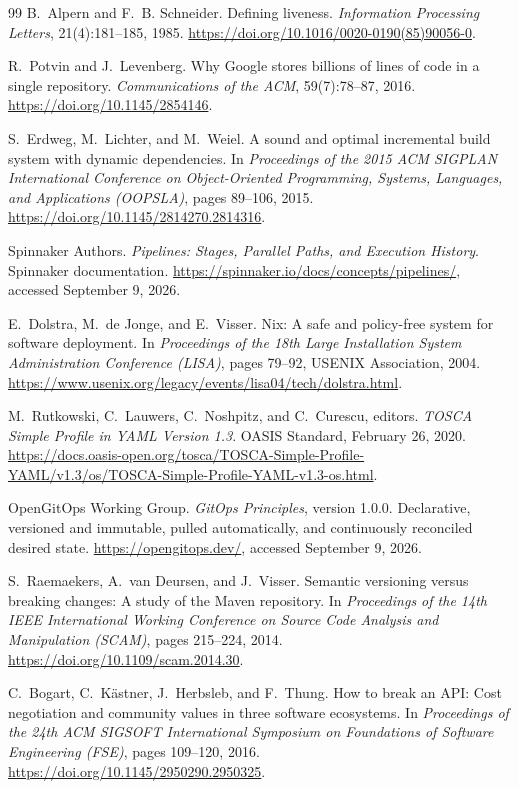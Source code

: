\begin{thebibliography}{99}
B.~Alpern and F.~B. Schneider.
Defining liveness.
\emph{Information Processing Letters}, 21(4):181--185, 1985.
\url{https://doi.org/10.1016/0020-0190(85)90056-0}.

R.~Potvin and J.~Levenberg.
Why Google stores billions of lines of code in a single repository.
\emph{Communications of the ACM}, 59(7):78--87, 2016.
\url{https://doi.org/10.1145/2854146}.

S.~Erdweg, M.~Lichter, and M.~Weiel.
A sound and optimal incremental build system with dynamic dependencies.
In \emph{Proceedings of the 2015 ACM SIGPLAN International Conference on
Object-Oriented Programming, Systems, Languages, and Applications (OOPSLA)},
pages 89--106, 2015.
\url{https://doi.org/10.1145/2814270.2814316}.

Spinnaker Authors.
\emph{Pipelines: Stages, Parallel Paths, and Execution History}.
Spinnaker documentation.
\url{https://spinnaker.io/docs/concepts/pipelines/}, accessed September 9, 2026.

E.~Dolstra, M.~de Jonge, and E.~Visser.
Nix: A safe and policy-free system for software deployment.
In \emph{Proceedings of the 18th Large Installation System Administration
Conference (LISA)}, pages 79--92, USENIX Association, 2004.
\url{https://www.usenix.org/legacy/events/lisa04/tech/dolstra.html}.

M.~Rutkowski, C.~Lauwers, C.~Noshpitz, and C.~Curescu, editors.
\emph{TOSCA Simple Profile in YAML Version 1.3}.
OASIS Standard, February 26, 2020.
\url{https://docs.oasis-open.org/tosca/TOSCA-Simple-Profile-YAML/v1.3/os/TOSCA-Simple-Profile-YAML-v1.3-os.html}.

OpenGitOps Working Group.
\emph{GitOps Principles}, version 1.0.0.
Declarative, versioned and immutable, pulled automatically, and continuously
reconciled desired state.
\url{https://opengitops.dev/}, accessed September 9, 2026.

S.~Raemaekers, A.~van Deursen, and J.~Visser.
Semantic versioning versus breaking changes: A study of the Maven
repository.
In \emph{Proceedings of the 14th IEEE International Working Conference
on Source Code Analysis and Manipulation (SCAM)}, pages 215--224, 2014.
\url{https://doi.org/10.1109/scam.2014.30}.

C.~Bogart, C.~K\"astner, J.~Herbsleb, and F.~Thung.
How to break an API: Cost negotiation and community values in three
software ecosystems.
In \emph{Proceedings of the 24th ACM SIGSOFT International Symposium on
Foundations of Software Engineering (FSE)}, pages 109--120, 2016.
\url{https://doi.org/10.1145/2950290.2950325}.


\end{thebibliography}
